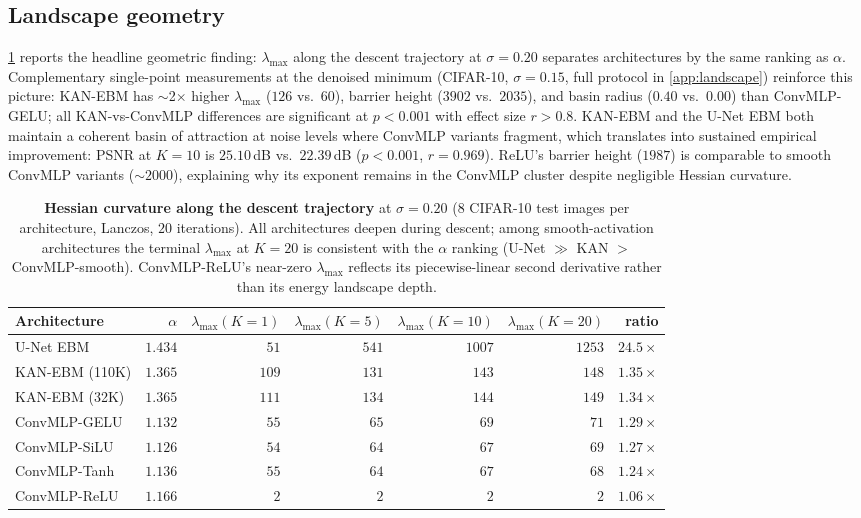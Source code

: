 \documentclass{article}
\begin{document}
\subsection{Landscape geometry}
\label{sec:landscape}
\cref{tab:hessian-trajectory} reports the headline geometric finding: $\lambda_{\max}$ along the descent trajectory at $\sigma{=}0.20$ separates architectures by the same ranking as $\alpha$. Complementary single-point measurements at the denoised minimum (CIFAR-10, $\sigma{=}0.15$, full protocol in \cref{app:landscape}) reinforce this picture: KAN-EBM has $\sim$2$\times$ higher $\lambda_{\max}$ ($126$ vs.~$60$), barrier height ($3902$ vs.~$2035$), and basin radius ($0.40$ vs.~$0.00$) than ConvMLP-GELU; all KAN-vs-ConvMLP differences are significant at $p{<}0.001$ with effect size $r{>}0.8$. KAN-EBM and the U-Net EBM both maintain a coherent basin of attraction at noise levels where ConvMLP variants fragment, which translates into sustained empirical improvement: PSNR at $K{=}10$ is $25.10$\,dB vs.~$22.39$\,dB ($p{<}0.001$, $r{=}0.969$). ReLU's barrier height ($1987$) is comparable to smooth ConvMLP variants ($\sim$$2000$), explaining why its exponent remains in the ConvMLP cluster despite negligible Hessian curvature.

\begin{table}[h]
\centering\small
\begin{tabular}{lrrrrrr}
\toprule
Architecture & $\alpha$ & $\lambda_{\max}{(K{=}1)}$ & $\lambda_{\max}{(K{=}5)}$ & $\lambda_{\max}{(K{=}10)}$ & $\lambda_{\max}{(K{=}20)}$ & ratio \\
\midrule
U-Net EBM       & $1.434$ &  $51$ & $541$ & $1007$ & $1253$ & $24.5\times$ \\
KAN-EBM (110K)  & $1.365$ & $109$ & $131$ &  $143$ &  $148$ & $1.35\times$ \\
KAN-EBM (32K)   & $1.365$ & $111$ & $134$ &  $144$ &  $149$ & $1.34\times$ \\
ConvMLP-GELU    & $1.132$ &  $55$ &  $65$ &   $69$ &   $71$ & $1.29\times$ \\
ConvMLP-SiLU    & $1.126$ &  $54$ &  $64$ &   $67$ &   $69$ & $1.27\times$ \\
ConvMLP-Tanh    & $1.136$ &  $55$ &  $64$ &   $67$ &   $68$ & $1.24\times$ \\
ConvMLP-ReLU    & $1.166$ &   $2$ &   $2$ &    $2$ &    $2$ & $1.06\times$ \\
\bottomrule
\end{tabular}
\caption{\textbf{Hessian curvature along the descent trajectory} at $\sigma{=}0.20$ ($8$ CIFAR-10 test images per architecture, Lanczos, $20$ iterations). All architectures deepen during descent; among smooth-activation architectures the terminal $\lambda_{\max}$ at $K{=}20$ is consistent with the $\alpha$ ranking (U-Net $\gg$ KAN $>$ ConvMLP-smooth). ConvMLP-ReLU's near-zero $\lambda_{\max}$ reflects its piecewise-linear second derivative rather than its energy landscape depth.}
\label{tab:hessian-trajectory}
\end{table}
\end{document}

